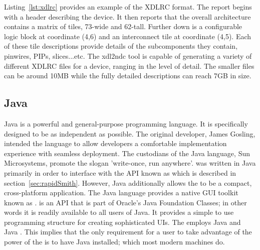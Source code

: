 Listing~\ref{lst:xdlrc} provides an example of the XDLRC format.
The report begins with a header describing the device.
It then reports that the overall architecture contains a matrix of tiles, 73-wide and 62-tall.
Further down is a configurable logic block at coordinate (4,6) and an interconnect tile at coordinate (4,5).
Each of these tile descriptions provide details of the subcomponents they contain, pinwires, \acrshort{PIP}s, slices...etc.
The \gls{xdl2ndc} tool is capable of generating a variety of different XDLRC files for a device, ranging in the level of detail.
The smaller files can be around 10MB while the fully detailed descriptions can reach 7GB in size.
\subsection{Java} \label{sec:java}
Java is a powerful and general-purpose programming language. 
It is specifically designed to be as independent as possible.
The original developer, James Gosling, intended the language to allow developers a comfortable implementation experience with seamless deployment. 
The custodians of the Java language, Sun Microsystems, promote the slogan 'write-once, run anywhere'.  
\NameNoPeriod was written in Java primarily in order to interface with the \acrshort{API} known as \RapidSmith which is described in section~\ref{sec:rapidSmith}.
However, Java additionally allows the \NameNoPeriod to be a compact, cross-platform application.
The Java language provides a native \acrfull{GUI} toolkit known as \SwingEnd.
\Swing is an \acrshort{API} that is part of Oracle's Java Foundation Classes; in other words it is readily available to all users of Java.
It provides a simple to use programming structure for creating sophisticated \acrshort{UIs}.
The \NameNoPeriod employs Java and Java \Swing.
This implies that the only requirement for a user to take advantage of the power of the \NameNoPeriod is to have Java installed; which most modern machines do.

